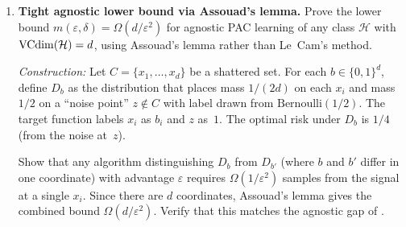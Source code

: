 \begin{enumerate}[leftmargin=*,itemsep=6pt]
\item \textbf{Tight agnostic lower bound via Assouad's lemma.}
  Prove the lower bound
  $m(\varepsilon, \delta) = \Omega(d/\varepsilon^2)$ for agnostic
  PAC learning of any class $\mathcal{H}$ with $\mathrm{VCdim}(\mathcal{H}) = d$,
  using Assouad's lemma rather than Le~Cam's method.

  \emph{Construction:} Let $C = \{x_1, \ldots, x_d\}$ be a shattered
  set.  For each $b \in \{0,1\}^d$, define $D_b$ as the distribution
  that places mass $1/(2d)$ on each $x_i$ and mass $1/2$ on a
  ``noise point'' $z \notin C$ with label drawn from
  $\mathrm{Bernoulli}(1/2)$.  The target function labels $x_i$ as
  $b_i$ and $z$ as~$1$.  The optimal risk under $D_b$ is $1/4$ (from
  the noise at~$z$).

  Show that any algorithm distinguishing $D_b$ from $D_{b'}$ (where
  $b$ and $b'$ differ in one coordinate) with advantage $\varepsilon$
  requires $\Omega(1/\varepsilon^2)$ samples from the signal at
  a single $x_i$.  Since there are $d$ coordinates, Assouad's
  lemma gives the combined bound $\Omega(d/\varepsilon^2)$.  Verify
  that this matches the agnostic gap of .

\end{enumerate}


